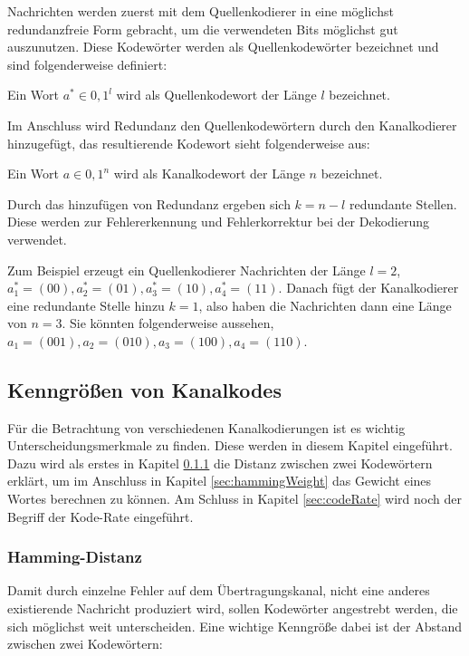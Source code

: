 Nachrichten werden zuerst mit dem Quellenkodierer in eine möglichst redundanzfreie Form gebracht, um die verwendeten Bits möglichst gut auszunutzen. Diese Kodewörter werden als Quellenkodewörter bezeichnet und sind folgenderweise definiert:

\begin{t_def}
Ein Wort $a^* \in {0,1}^l$ wird als Quellenkodewort der Länge $l$ bezeichnet.
\end{t_def}

Im Anschluss wird Redundanz den Quellenkodewörtern durch den Kanalkodierer hinzugefügt, das resultierende Kodewort sieht folgenderweise aus:

\begin{t_def}
Ein Wort $a \in {0,1}^n$ wird als Kanalkodewort der Länge $n$ bezeichnet.
\end{t_def} 

Durch das hinzufügen von Redundanz ergeben sich $k = n - l$ redundante Stellen. Diese werden zur Fehlererkennung und Fehlerkorrektur bei der Dekodierung verwendet.

Zum Beispiel erzeugt ein Quellenkodierer Nachrichten der Länge $l=2$, $a^*_{1}=(00),a^*_{2}=(01),a^*_{3}=(10),a^*_{4}=(11)$. Danach fügt der Kanalkodierer eine redundante Stelle hinzu $k=1$, also haben die Nachrichten dann eine Länge von $n=3$. Sie könnten folgenderweise aussehen, $a_{1}=(001),a_{2}=(010),a_{3}=(100),a_{4}=(110)$.

\subsection{Kenngrößen von Kanalkodes}
\label{sec:channelParameters}
Für die Betrachtung von verschiedenen Kanalkodierungen ist es wichtig Unterscheidungsmerkmale zu finden. Diese werden in diesem Kapitel eingeführt. Dazu wird als erstes in Kapitel \ref{sec:hammingDistance} die Distanz zwischen zwei Kodewörtern erklärt, um im Anschluss in Kapitel \ref{sec:hammingWeight} das Gewicht eines Wortes berechnen zu können. Am Schluss in Kapitel \ref{sec:codeRate} wird noch der Begriff der Kode-Rate eingeführt.

\subsubsection{Hamming-Distanz}
\label{sec:hammingDistance}
Damit durch einzelne Fehler auf dem Übertragungskanal, nicht eine anderes existierende Nachricht produziert wird, sollen Kodewörter angestrebt werden, die sich möglichst weit unterscheiden. Eine wichtige Kenngröße dabei ist der Abstand zwischen zwei Kodewörtern:

